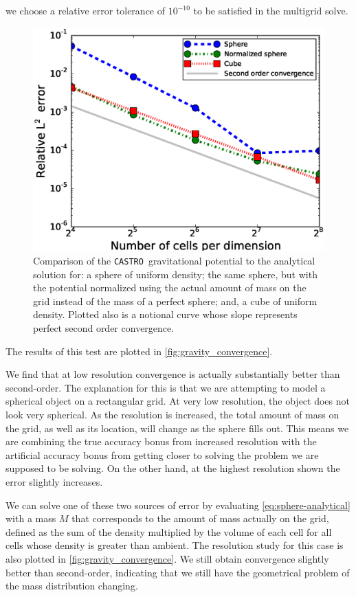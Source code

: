 \documentclass[iop]{../emulateapj}
\newcommand{\castro}{\texttt{CASTRO}}
\begin{document}
we choose a relative error tolerance of $10^{-10}$ to be satisfied in the multigrid solve.
\begin{figure}[h]
  \centering
  \includegraphics[scale=0.45]{plots/phi_comparison}
  \caption{Comparison of the \castro\ gravitational potential to the analytical solution for: 
    a sphere of uniform density; the same sphere, but with the potential normalized using the 
    actual amount of mass on the grid instead of the mass of a perfect sphere; and, a 
    cube of uniform density. Plotted also is a notional curve whose slope represents
    perfect second order convergence.\label{fig:gravity_convergence}}
\end{figure}
The results of this test are plotted in \autoref{fig:gravity_convergence}. 

We find that at low resolution 
convergence is actually substantially better than second-order. The 
explanation for this is that we are attempting to model a spherical 
object on a rectangular grid. At very low resolution, the object does 
not look very spherical. As the resolution is increased, the total 
amount of mass on the grid, as well as its location, will change 
as the sphere fills out. This means we are combining the true accuracy 
bonus from increased resolution with the artificial accuracy bonus 
from getting closer to solving the problem we are supposed to be solving. 
On the other hand, at the highest resolution shown the error slightly increases.

We can solve one of these two sources of error by evaluating 
\autoref{eq:sphere-analytical} with a mass $M$ that corresponds to the
amount of mass actually on the grid, defined as the sum of the density
multiplied by the volume of each cell for all cells whose density is 
greater than ambient. The resolution study for this case is also
plotted in \autoref{fig:gravity_convergence}. We still obtain
convergence slightly better than second-order, indicating that we 
still have the geometrical problem of the mass distribution changing.
\end{document}
